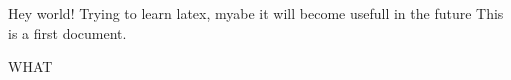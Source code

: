 \documentclass{article}
\begin{document}
Hey world!
Trying to learn latex, myabe it will become usefull in the future
This is a first document.

WHAT
\end{document}
